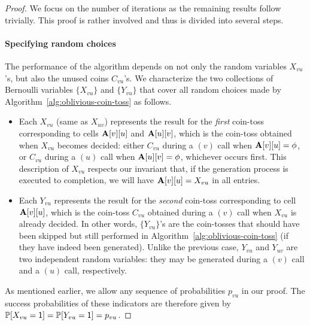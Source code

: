 \begin{proof}
We focus on the number of iterations as the remaining results follow trivially. This proof is rather involved and thus is divided into several steps.

\paragraph*{Specifying random choices} The performance of the algorithm depends on not only the random variables $X_{vu}$'s, but also the unused coins $C_{vu}$'s. We characterize the two collections of Bernoulli variables $\{X_{vu}\}$ and $\{Y_{vu}\}$ that cover all random choices made by Algorithm~\ref{alg:oblivious-coin-toss} as follows.

\begin{itemize}
\item Each $X_{vu}$ (same as $X_{uv}$) represents the result for the \emph{first} coin-toss corresponding to cells $\mathbf{A}[v][u]$ and $\mathbf{A}[u][v]$, which is the coin-toss obtained when $X_{vu}$ becomes decided: either $C_{vu}$ during a $(v)$ call when $\mathbf{A}[v][u] = \phi$, or $C_{vu}$ during a $(u)$ call when $\mathbf{A}[u][v] = \phi$, whichever occurs first.
This description of $X_{vu}$ respects our invariant that, if the generation process is executed to completion, we will have $\mathbf{A}[v][u]=X_{vu}$ in all entries.
\item Each $Y_{vu}$ represents the result for the \emph{second} coin-toss corresponding to cell $\mathbf{A}[v][u]$, which is the coin-toss $C_{vu}$ obtained during a $(v)$ call when $X_{vu}$ is already decided. In other words, $\{Y_{vu}\}$'s are the coin-tosses that should have been skipped but still performed in Algorithm~\ref{alg:oblivious-coin-toss} (if they have indeed been generated). Unlike the previous case, $Y_{vu}$ and $Y_{uv}$ are two independent random variables: they may be generated during a $(v)$ call and a $(u)$ call, respectively.
\end{itemize}
As mentioned earlier, we allow any sequence of probabilities $p_{vu}$ in our proof. The success probabilities of these indicators are therefore given by $\mathbb P[X_{vu}=\mathsf{1}] = \mathbb P[Y_{vu}=\mathsf{1}] = p_{vu}$.


\end{proof}
